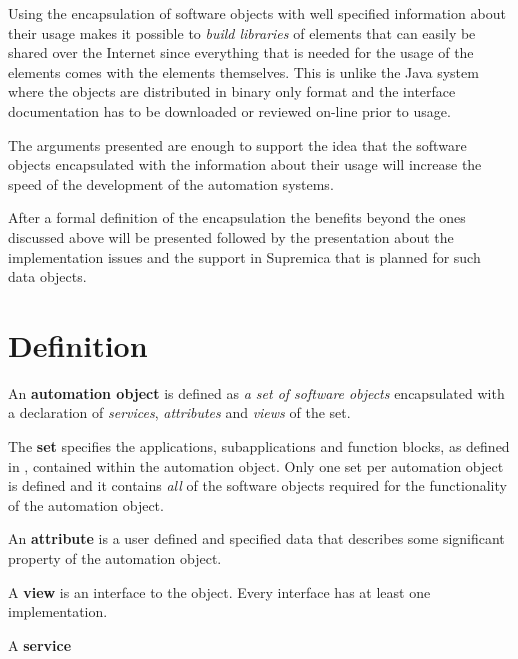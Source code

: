 Using the encapsulation of software objects with well
specified information about their usage makes it possible to
\textit{build libraries} of elements that can easily be
shared over the Internet since everything that is needed for
the usage of the elements comes with the elements
themselves. This is unlike the Java system where the objects
are distributed in binary only format and the interface
documentation has to be downloaded or reviewed on-line prior
to usage.

The arguments presented are enough to support the idea that
the software objects encapsulated with the information about
their usage will increase the speed of the development of
the automation systems. 

After a formal definition of the encapsulation the benefits
beyond the ones discussed above will be presented followed
by the presentation about the implementation issues and the
support in Supremica that is planned for such data objects.





\section{Definition}
An \textbf{automation object} is defined as \textit{a set of
  software objects} encapsulated with a declaration of
\textit{services}, \textit{attributes} and \textit{views} of
the set.

The \textbf{set} specifies the applications, subapplications
and function blocks, as defined in \cite{iec:614991:2000},
contained within the automation object. Only one set per
automation object is defined and it contains \textit{all} of
the software objects required for the functionality of the
automation object.

An \textbf{attribute} is a user defined and specified data that
describes some significant property of the automation
object. 

A \textbf{view} is an interface to the object. Every
interface has at least one implementation.


A \textbf{service} 




